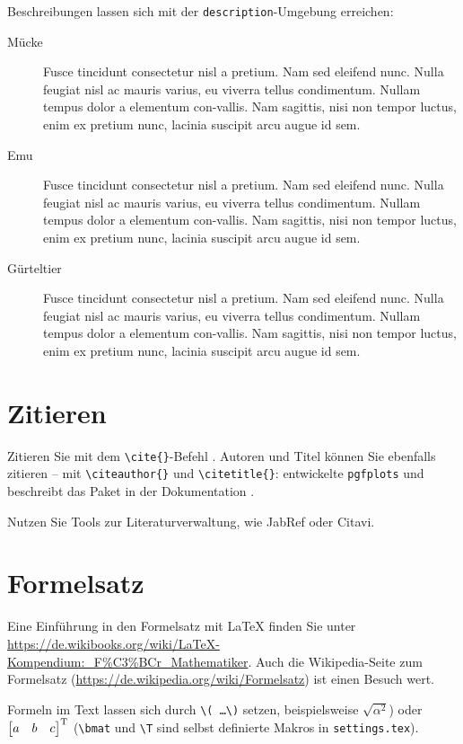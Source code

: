 Beschreibungen lassen sich mit der \texttt{description}-Umgebung erreichen:

\begin{description}
    \item[Mücke] Fusce tincidunt consectetur nisl a pretium. Nam sed eleifend nunc. Nulla feugiat nisl ac mauris varius, eu viverra tellus condimentum. Nullam tempus dolor a elementum con-vallis. Nam sagittis, nisi non tempor luctus, enim ex pretium nunc, lacinia suscipit arcu augue id sem.
    \item[Emu] Fusce tincidunt consectetur nisl a pretium. Nam sed eleifend nunc. Nulla feugiat nisl ac mauris varius, eu viverra tellus condimentum. Nullam tempus dolor a elementum con-vallis. Nam sagittis, nisi non tempor luctus, enim ex pretium nunc, lacinia suscipit arcu augue id sem.
    \item[Gürteltier] Fusce tincidunt consectetur nisl a pretium. Nam sed eleifend nunc. Nulla feugiat nisl ac mauris varius, eu viverra tellus condimentum. Nullam tempus dolor a elementum con-vallis. Nam sagittis, nisi non tempor luctus, enim ex pretium nunc, lacinia suscipit arcu augue id sem.
\end{description}

\section{Zitieren}

Zitieren Sie mit dem \texttt{\textbackslash cite\{\}}-Befehl \cite{Cochran2005,Cubitt2013}.
Autoren und Titel können Sie ebenfalls zitieren -- mit \texttt{\textbackslash citeauthor\{\}} und \texttt{\textbackslash citetitle\{\}}: \citeauthor{Feuersaenger2014} entwickelte \texttt{pgfplots} und beschreibt das Paket in der Dokumentation \textit{}.

Nutzen Sie Tools zur Literaturverwaltung, wie JabRef oder Citavi.

\section{Formelsatz}

Eine Einführung in den Formelsatz mit \LaTeX{} finden Sie unter \url{https://de.wikibooks.org/wiki/LaTeX-Kompendium:_F%C3%BCr_Mathematiker}.
Auch die Wikipedia-Seite zum Formelsatz (\url{https://de.wikipedia.org/wiki/Formelsatz}) ist einen Besuch wert.

Formeln im Text lassen sich durch \texttt{\textbackslash( \ldots \textbackslash)} setzen, beispielsweise \(\sqrt{\alpha^2}\)) oder \( \begin{bmatrix} a & b & c \end{bmatrix}^{\mathrm{T}} \) (\texttt{\textbackslash bmat} und \texttt{\textbackslash T} sind selbst definierte Makros in \texttt{settings.tex}).

